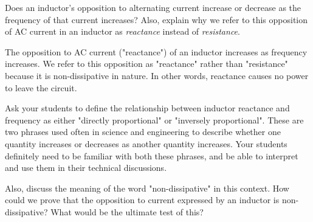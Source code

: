 

Does an inductor's opposition to alternating current increase or decrease as the frequency of that current increases?  Also, explain why we refer to this opposition of AC current in an inductor as {\it reactance} instead of {\it resistance}.







The opposition to AC current ("reactance") of an inductor increases as frequency increases.  We refer to this opposition as "reactance" rather than "resistance" because it is non-dissipative in nature.  In other words, reactance causes no power to leave the circuit.







Ask your students to define the relationship between inductor reactance and frequency as either "directly proportional" or "inversely proportional".  These are two phrases used often in science and engineering to describe whether one quantity increases or decreases as another quantity increases.  Your students definitely need to be familiar with both these phrases, and be able to interpret and use them in their technical discussions.  

Also, discuss the meaning of the word "non-dissipative" in this context.  How could we prove that the opposition to current expressed by an inductor is non-dissipative?  What would be the ultimate test of this?




